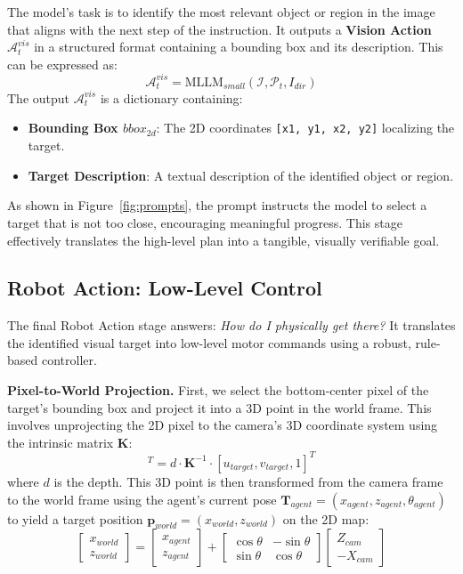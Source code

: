 \documentclass[letterpaper, 10 pt, conference]{ieeeconf}
\begin{document}
The model's task is to identify the most relevant object or region in the image that aligns with the next step of the instruction. It outputs a \textbf{Vision Action $\mathcal{A}^{vis}_t$} in a structured format containing a bounding box and its description. This can be expressed as:
\begin{equation}
\mathcal{A}^{vis}_t = \text{MLLM}_{small}(\mathcal{I}, \mathcal{P}_t, I_{dir})
\end{equation}
The output $\mathcal{A}^{vis}_t$ is a dictionary containing:
\begin{itemize}
    \item \textbf{Bounding Box $bbox_{2d}$}: The 2D coordinates \texttt{[x1, y1, x2, y2]} localizing the target.
    \item \textbf{Target Description}: A textual description of the identified object or region.
\end{itemize}
As shown in Figure~\ref{fig:prompts}, the prompt instructs the model to select a target that is not too close, encouraging meaningful progress. This stage effectively translates the high-level plan into a tangible, visually verifiable goal.

\subsection{Robot Action: Low-Level Control}
The final Robot Action stage answers: \textit{How do I physically get there?} It translates the identified visual target into low-level motor commands using a robust, rule-based controller.

\noindent\textbf{Pixel-to-World Projection.}
First, we select the bottom-center pixel of the target's bounding box and project it into a 3D point in the world frame. This involves unprojecting the 2D pixel to the camera's 3D coordinate system using the intrinsic matrix $\mathbf{K}$:
\begin{equation}
    [X_{cam}, Y_{cam}, Z_{cam}]^T = d \cdot \mathbf{K}^{-1} \cdot [u_{target}, v_{target}, 1]^T
\end{equation}
where $d$ is the depth. This 3D point is then transformed from the camera frame to the world frame using the agent's current pose $\mathbf{T}_{agent} = (x_{agent}, z_{agent}, \theta_{agent})$ to yield a target position $\mathbf{p}_{world} = (x_{world}, z_{world})$ on the 2D map:
\begin{equation}
    \begin{bmatrix} x_{world} \\ z_{world} \end{bmatrix} = \begin{bmatrix} x_{agent} \\ z_{agent} \end{bmatrix} + \begin{bmatrix} \cos\theta & -\sin\theta \\ \sin\theta & \cos\theta \end{bmatrix} \begin{bmatrix} Z_{cam} \\ -X_{cam} \end{bmatrix}
\end{equation}
\end{document}
